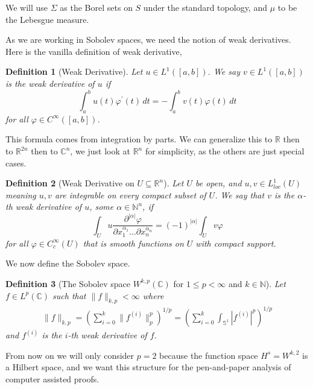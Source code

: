\documentclass{article}
\newcommand{\C}{\mathbb{C}}
\newcommand{\N}{\mathbb{N}}
\newcommand{\R}{\mathbb{R}}
\newcommand{\s}{\mathbb{S}^1}
\theoremstyle{plain}
\newtheorem*{dfn}{Definition}
\theoremstyle{remark}
\begin{document}
We will use $\Sigma$ as the Borel sets on $S$ under the standard topology, and $\mu$ to be the Lebesgue measure. 

As we are working in Sobolev spaces, we need the notion of weak derivatives. 
Here is the vanilla definition of weak derivative,

\begin{dfn}[Weak Derivative]
Let $u \in L^1([a,b])$. 
We say $v \in L^1([a,b])$ is the weak derivative of $u$ if
\begin{equation*}
\int_a^b u(t) \varphi^\prime(t) \, dt = - \int_a^b v(t) \varphi(t) \, dt
\end{equation*}
for all $\varphi \in C^\infty([a,b])$.
\end{dfn}

This formula comes from integration by parts. 
We can generalize this to $\R$ then to $\R^{2n}$ then to $\C^n$, we just look at $\R^n$ for simplicity, as the others are just special cases.

\begin{dfn}[Weak Derivative on $U \subseteq \R^n$]
Let $U$ be open, and $u,v \in L^1_{loc}(U)$ meaning $u,v$ are integrable on every compact subset of $U$. 
We say that $v$ is the $\alpha$-th weak derivative of $u$, some $\alpha \in \N^n$, if
\begin{equation*}
\int_U u \frac{\partial^{|\alpha|}\varphi}{\partial x_1^{\alpha_1}\dots \partial x_n^{\alpha_n}} = (-1)^{|\alpha|} \int_U v\varphi
\end{equation*}
for all $\varphi \in C^\infty_c(U)$ that is smooth functions on $U$ with compact support. 
\end{dfn}

We now define the Sobolev space. 

\begin{dfn}[The Sobolev space $W^{k,p}(\C)$ for $1 \leq p < \infty$ and $k \in \N$]
Let $f \in L^p(\C)$ such that $\|f\|_{k,p} < \infty$ where
\begin{align*}
\|f\|_{k,p} = \left( \sum_{i=0}^k \| f^{(i)} \|_p^p \right)^{1/p} = \left( \sum_{i=0}^k \int_{\s} | f^{(i)} |^p \right)^{1/p}
\end{align*}
and $f^{(i)}$ is the $i$-th weak derivative of $f$.
\end{dfn}

From now on we will only consider $p = 2$ because the function space $H^s = W^{k,2}$ is a Hilbert space, and we want this structure for the pen-and-paper analysis of computer assisted proofs.
\end{document}
